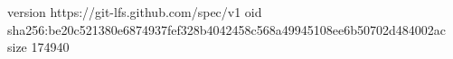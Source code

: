version https://git-lfs.github.com/spec/v1
oid sha256:be20c521380e6874937fef328b4042458c568a49945108ee6b50702d484002ac
size 174940
